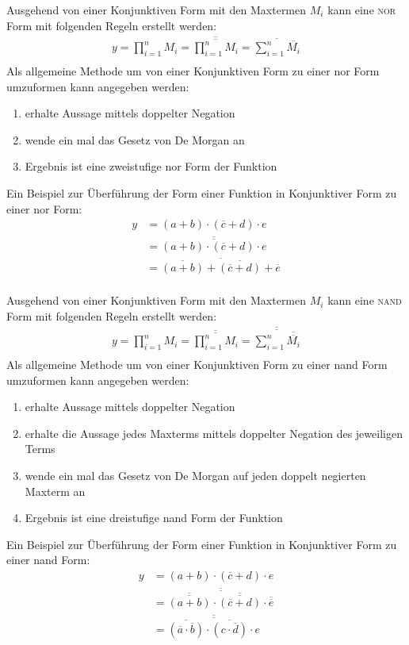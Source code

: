 Ausgehend von einer Konjunktiven Form mit den Maxtermen $M_i$ kann eine \textsc{nor} Form mit folgenden Regeln erstellt werden:
\begin{align*}
	y = \prod_{i=1}^n M_i = \overline{\overline{\prod_{i=1}^n M_i}} = \overline{\sum_{i=1}^n \overline{M_i}} \\
\end{align*}
Als allgemeine Methode um von einer Konjunktiven Form zu einer {\sc nor} Form umzuformen kann angegeben werden:
\begin{enumerate}
  \item erhalte Aussage mittels doppelter Negation
  \item wende ein mal das Gesetz von De Morgan an
  \item Ergebnis ist eine zweistufige {\sc nor} Form der Funktion
\end{enumerate}
Ein Beispiel zur Überführung der Form einer Funktion in Konjunktiver Form zu einer {\sc nor} Form: 
\begin{align*}
	y &= (a + b) \cdot (\overline{c} + d) \cdot e \\
	  &= \overline{\overline{(a + b) \cdot (\overline{c} + d) \cdot e}} \\
	  &= \overline{\overline{(a + b)} + \overline{(\overline{c} + d)} + \overline{e}} \\
\end{align*}

Ausgehend von einer Konjunktiven Form mit den Maxtermen $M_i$ kann eine \textsc{nand} Form mit folgenden Regeln erstellt werden:
\begin{align*}
	y = \prod_{i=1}^n M_i = \overline{\overline{\prod_{i=1}^n M_i}} 
		= \overline{\overline{\sum_{i=1}^n \overline{\overline{M_i}}}} \\
\end{align*}
Als allgemeine Methode um von einer Konjunktiven Form zu einer {\sc nand} Form umzuformen kann angegeben werden:
\begin{enumerate}
  \item erhalte Aussage mittels doppelter Negation
  \item erhalte die Aussage jedes Maxterms mittels doppelter Negation des jeweiligen Terms
  \item wende ein mal das Gesetz von De Morgan auf jeden doppelt negierten Maxterm an
  \item Ergebnis ist eine dreistufige {\sc nand} Form der Funktion
\end{enumerate}
Ein Beispiel zur Überführung der Form einer Funktion in Konjunktiver Form zu einer {\sc nand} Form: 
\begin{align*}
	y &= (a + b) \cdot (\overline{c} + d) \cdot e \\
	  &= \overline{\overline{\overline{\overline{(a + b)}} \cdot \overline{\overline{(\overline{c} + d)}} 
	  	\cdot \overline{\overline{e}}}} \\
	  &= \overline{\overline{\overline{(\overline{a} \cdot \overline{b})} 
	  	\cdot \overline{(c \cdot \overline{d})} \cdot e}} \\	  
\end{align*}

